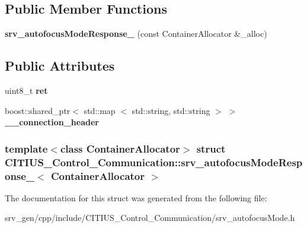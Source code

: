 \subsection*{\-Public \-Member \-Functions}
\begin{DoxyCompactItemize}
\item 
\hypertarget{struct_c_i_t_i_u_s___control___communication_1_1srv__autofocus_mode_response___a81fbbda2fe45a97c3c25ad4e1bf99c0b}{{\bfseries srv\-\_\-autofocus\-Mode\-Response\-\_\-} (const \-Container\-Allocator \&\-\_\-alloc)}\label{struct_c_i_t_i_u_s___control___communication_1_1srv__autofocus_mode_response___a81fbbda2fe45a97c3c25ad4e1bf99c0b}

\end{DoxyCompactItemize}
\subsection*{\-Public \-Attributes}
\begin{DoxyCompactItemize}
\item 
\hypertarget{struct_c_i_t_i_u_s___control___communication_1_1srv__autofocus_mode_response___a07eaea96e0b7230d49ff5136147240d4}{uint8\-\_\-t {\bfseries ret}}\label{struct_c_i_t_i_u_s___control___communication_1_1srv__autofocus_mode_response___a07eaea96e0b7230d49ff5136147240d4}

\item 
\hypertarget{struct_c_i_t_i_u_s___control___communication_1_1srv__autofocus_mode_response___af7b2eba07e625b2d47b3fcaa20ecee1f}{boost\-::shared\-\_\-ptr$<$ std\-::map\*
$<$ std\-::string, std\-::string $>$ $>$ {\bfseries \-\_\-\-\_\-connection\-\_\-header}}\label{struct_c_i_t_i_u_s___control___communication_1_1srv__autofocus_mode_response___af7b2eba07e625b2d47b3fcaa20ecee1f}

\end{DoxyCompactItemize}
\subsubsection*{template$<$class Container\-Allocator$>$ struct C\-I\-T\-I\-U\-S\-\_\-\-Control\-\_\-\-Communication\-::srv\-\_\-autofocus\-Mode\-Response\-\_\-$<$ Container\-Allocator $>$}



\-The documentation for this struct was generated from the following file\-:\begin{DoxyCompactItemize}
\item 
srv\-\_\-gen/cpp/include/\-C\-I\-T\-I\-U\-S\-\_\-\-Control\-\_\-\-Communication/srv\-\_\-autofocus\-Mode.\-h\end{DoxyCompactItemize}
